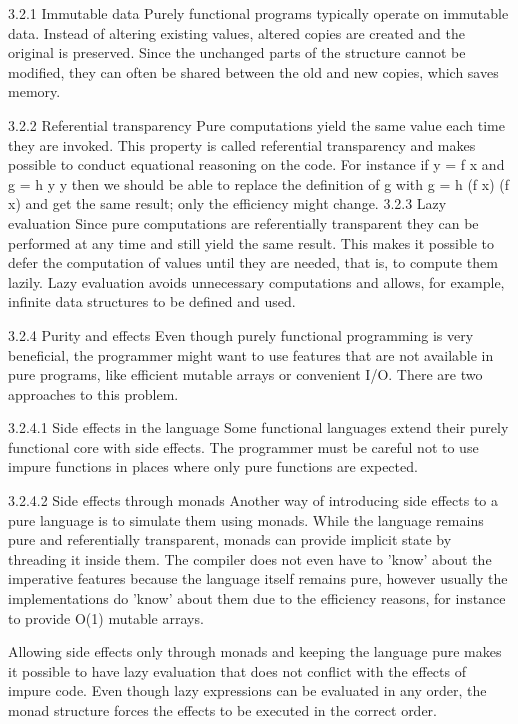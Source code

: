 \documentclass{report}
\begin{document}
3.2.1 Immutable data
Purely functional programs typically operate on immutable data. Instead of altering existing values, altered copies are created and the original is preserved. Since the unchanged parts of the structure cannot be modified, they can often be shared between the old and new copies, which saves memory.

3.2.2 Referential transparency
Pure computations yield the same value each time they are invoked. This property is called referential transparency and makes possible to conduct equational reasoning on the code. For instance if y = f x and g = h y y then we should be able to replace the definition of g with g = h (f x) (f x) and get the same result; only the efficiency might change.
3.2.3 Lazy evaluation
Since pure computations are referentially transparent they can be performed at any time and still yield the same result. This makes it possible to defer the computation of values until they are needed, that is, to compute them lazily. Lazy evaluation avoids unnecessary computations and allows, for example, infinite data structures to be defined and used.

3.2.4 Purity and effects
Even though purely functional programming is very beneficial, the programmer might want to use features that are not available in pure programs, like efficient mutable arrays or convenient I/O. There are two approaches to this problem.

3.2.4.1 Side effects in the language
Some functional languages extend their purely functional core with side effects. The programmer must be careful not to use impure functions in places where only pure functions are expected.

3.2.4.2 Side effects through monads
Another way of introducing side effects to a pure language is to simulate them using monads. While the language remains pure and referentially transparent, monads can provide implicit state by threading it inside them. The compiler does not even have to 'know' about the imperative features because the language itself remains pure, however usually the implementations do 'know' about them due to the efficiency reasons, for instance to provide O(1) mutable arrays.

Allowing side effects only through monads and keeping the language pure makes it possible to have lazy evaluation that does not conflict with the effects of impure code. Even though lazy expressions can be evaluated in any order, the monad structure forces the effects to be executed in the correct order.
\end{document}
